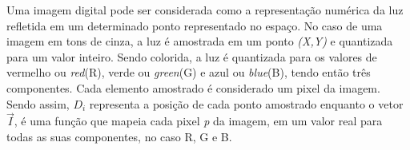 Uma imagem digital pode ser considerada como a representação numérica da luz refletida em um determinado ponto representado no espaço. No caso de uma imagem em tons de cinza, a luz é amostrada em um ponto \textit{(X,Y)} e quantizada para um valor inteiro. Sendo colorida, a luz é quantizada para os valores de vermelho ou \textit{red}(R), verde ou \textit{green}(G) e azul ou \textsl{blue}(B), tendo então três componentes. Cada elemento amostrado é considerado um pixel da imagem. Sendo assim, \textit{$D_i$} representa a posição de cada ponto amostrado enquanto o vetor \textit{$\vec{I}$}, é uma função que mapeia cada pixel \textit{p} da imagem, em um valor real para todas as suas componentes, no caso R, G e B.









